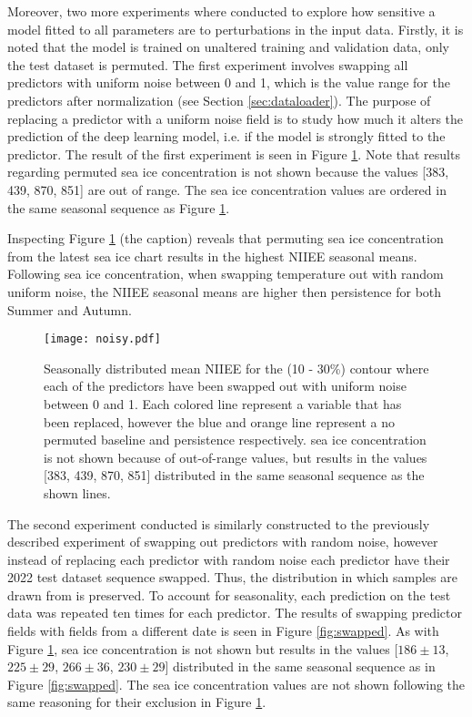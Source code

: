 \documentclass[../main/thesis.tex]{subfiles}
\begin{document}
Moreover, two more experiments where conducted to explore how sensitive a model fitted to all parameters are to perturbations in the input data. Firstly, it is noted that the model is trained on unaltered training and validation data, only the test dataset is permuted. The first experiment involves swapping all predictors with uniform noise between 0 and 1, which is the value range for the predictors after normalization (see Section \ref{sec:dataloader}). The purpose of replacing a predictor with a uniform noise field is to study how much it alters the prediction of the deep learning model, i.e. if the model is strongly fitted to the predictor. The result of the first experiment is seen in Figure \ref{fig:noisy}. Note that results regarding permuted sea ice concentration is not shown because the values [383, 439, 870, 851] are out of range. The sea ice concentration values are ordered in the same seasonal sequence as Figure \ref{fig:noisy}.

Inspecting Figure \ref{fig:noisy} (the caption) reveals that permuting sea ice concentration from the latest sea ice chart results in the highest NIIEE seasonal means. Following sea ice concentration, when swapping temperature out with random uniform noise, the NIIEE seasonal means are higher then persistence for both Summer and Autumn. 

\begin{figure}
    \centering
    \texttt{[image: noisy.pdf]}
    \caption{\label{fig:noisy}Seasonally distributed mean NIIEE for the (10 - 30\%) contour where each of the predictors have been swapped out with uniform noise between 0 and 1. Each colored line represent a variable that has been replaced, however the blue and orange line represent a no permuted baseline and persistence respectively. sea ice concentration is not shown because of out-of-range values, but results in the values [383, 439, 870, 851] distributed in the same seasonal sequence as the shown lines.}
\end{figure}

The second experiment conducted is similarly constructed to the previously described experiment of swapping out predictors with random noise, however instead of replacing each predictor with random noise each predictor have their 2022 test dataset sequence swapped. Thus, the distribution in which samples are drawn from is preserved. To account for seasonality, each prediction on the test data was repeated ten times for each predictor. The results of swapping predictor fields with fields from a different date is seen in Figure \ref{fig:swapped}. As with Figure \ref{fig:noisy}, sea ice concentration is not shown but results in the values [$186 \pm 13$, $225 \pm 29$, $266 \pm 36$, $230 \pm 29$] distributed in the same seasonal sequence as in Figure \ref{fig:swapped}. The sea ice concentration values are not shown following the same reasoning for their exclusion in Figure \ref{fig:noisy}.
\end{document}

